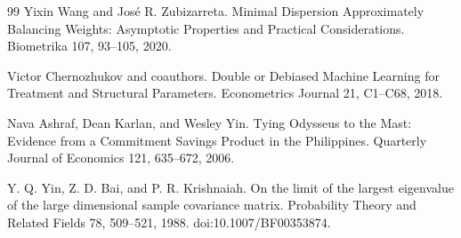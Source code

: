 \documentclass{article}
\begin{document}
\begin{thebibliography}{99}
   Yixin Wang and José R. Zubizarreta. Minimal Dispersion Approximately Balancing Weights: Asymptotic Properties and Practical Considerations. Biometrika 107, 93--105, 2020.

   Victor Chernozhukov and coauthors. Double or Debiased Machine Learning for Treatment and Structural Parameters. Econometrics Journal 21, C1--C68, 2018.

   Nava Ashraf, Dean Karlan, and Wesley Yin. Tying Odysseus to the Mast: Evidence from a Commitment Savings Product in the Philippines. Quarterly Journal of Economics 121, 635--672, 2006.

   Y. Q. Yin, Z. D. Bai, and P. R. Krishnaiah. On the limit of the largest eigenvalue of the large dimensional sample covariance matrix. Probability Theory and Related Fields 78, 509--521, 1988. doi:10.1007/BF00353874.

\end{thebibliography}
\end{document}
